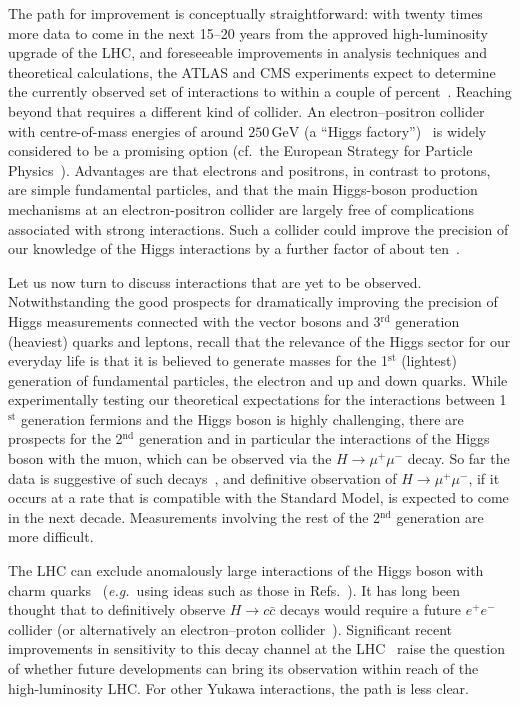\documentclass[12pt]{article}
\newcommand{\GeV}{\,\text{GeV}}
\begin{document}
The path for improvement is conceptually straightforward: with twenty
times more data to come in the next 15--20 years from the
approved high-luminosity upgrade of the LHC, and foreseeable improvements in
analysis techniques and theoretical calculations, the ATLAS and CMS
experiments expect to determine the currently observed set of
interactions to within a couple of percent~\cite{Dainese:2019rgk}.
%
Reaching beyond that requires a different kind of collider.
%
An electron--positron collider with centre-of-mass energies of around
$250\GeV$ (a ``Higgs factory'')~
\cite{FCC:2018evy,Roloff:2018dqu,Baer:2013cma,CEPCStudyGroup:2018ghi,Bai:2021rdg}
is widely considered to be a promising option (cf.\ the European Strategy
for Particle Physics~\cite{CERN-ESU-015}).
%
Advantages are that electrons and positrons, in contrast to protons,
are simple fundamental particles, and that the main Higgs-boson production
mechanisms at an electron-positron collider are largely free of
complications associated with strong interactions.
% 
Such a collider could improve the precision of our knowledge of the
Higgs interactions by a further factor of about ten~\cite{deBlas:2019rxi}.
%

Let us now turn to discuss interactions that are yet to be observed.
%
Notwithstanding the good prospects for dramatically improving the
precision of Higgs measurements connected with the vector bosons and 3$^\text{rd}$
generation (heaviest) quarks and leptons, 
%
recall that the relevance of the Higgs sector for our everyday life is
that it is believed to generate masses for the 1$^\text{st}$
(lightest) generation of fundamental particles, the electron and up and
down quarks.
While experimentally testing our theoretical expectations for the interactions between 1$^\text{st}$ generation fermions and the Higgs boson is highly
challenging, there are prospects for the 2$^\text{nd}$ generation and
in particular the interactions of the Higgs boson with the muon, which
can be observed via the $H \to \mu^+\mu^-$ decay.
So far the data is suggestive of such
decays~\cite{ATLAS:2020fzp,CMS:2020xwi}, and definitive observation of
$H \to \mu^+\mu^-$, if it occurs at a rate that is compatible with the
Standard Model, is expected to come in the next decade.
%
Measurements involving the rest of the 2$^\text{nd}$ generation are more difficult.

The LHC can exclude anomalously large interactions of the Higgs boson
with charm quarks~\cite{Dainese:2019rgk} ({\it e.g.}\ using ideas such as
those in Refs.~\cite{Bishara:2016jga,Soreq:2016rae}).
%
It has long been thought that to definitively observe $H \to c\bar c$
decays would require a future $e^+e^-$ collider (or alternatively an
electron--proton collider~\cite{Andre:2022xeh}).
%
Significant recent improvements in sensitivity to this decay channel
at the LHC~\cite{ATLAS:2022ers,CMS:2022psv} raise the question of
whether future developments can bring its observation within reach of
the high-luminosity LHC.
%
For other Yukawa interactions, the path is less clear.
\end{document}
